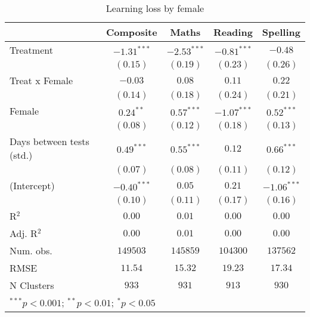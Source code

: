 
\begin{table}
\begin{center}
\begin{tabular}{l c c c c}
\hline
 & Composite & Maths & Reading & Spelling \\
\hline
Treatment                 & $-1.31^{***}$ & $-2.53^{***}$ & $-0.81^{***}$ & $-0.48$       \\
                          & $(0.15)$      & $(0.19)$      & $(0.23)$      & $(0.26)$      \\
Treat x Female            & $-0.03$       & $0.08$        & $0.11$        & $0.22$        \\
                          & $(0.14)$      & $(0.18)$      & $(0.24)$      & $(0.21)$      \\
Female                    & $0.24^{**}$   & $0.57^{***}$  & $-1.07^{***}$ & $0.52^{***}$  \\
                          & $(0.08)$      & $(0.12)$      & $(0.18)$      & $(0.13)$      \\
Days between tests (std.) & $0.49^{***}$  & $0.55^{***}$  & $0.12$        & $0.66^{***}$  \\
                          & $(0.07)$      & $(0.08)$      & $(0.11)$      & $(0.12)$      \\
(Intercept)               & $-0.40^{***}$ & $0.05$        & $0.21$        & $-1.06^{***}$ \\
                          & $(0.10)$      & $(0.11)$      & $(0.17)$      & $(0.16)$      \\
\hline
R$^2$                     & $0.00$        & $0.01$        & $0.00$        & $0.00$        \\
Adj. R$^2$                & $0.00$        & $0.01$        & $0.00$        & $0.00$        \\
Num. obs.                 & $149503$      & $145859$      & $104300$      & $137562$      \\
RMSE                      & $11.54$       & $15.32$       & $19.23$       & $17.34$       \\
N Clusters                & $933$         & $931$         & $913$         & $930$         \\
\hline
\multicolumn{5}{l}{\scriptsize{$^{***}p<0.001$; $^{**}p<0.01$; $^{*}p<0.05$}}
\end{tabular}
\caption{Learning loss by female}
\label{tablefemale}
\end{center}
\end{table}
